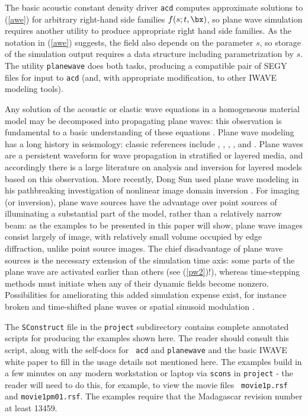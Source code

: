 The basic acoustic constant density driver {\tt acd} computes approximate solutions to (\ref{awe}) for arbitrary right-hand side families $f(s;t,\bx)$, so plane wave simulation requires another utility to produce appropriate right hand side families. As the notation in (\ref{awe}) suggests, the field also depends on the parameter $s$, so storage of the simulation output requires a data structure including parametrization by $s$. The utility {\tt planewave} does both tasks, producing a compatible pair of SEGY files for input to {\tt acd} (and, with appropriate modification, to other IWAVE modeling tools).

Any solution of the acoustic or elastic wave equations in a homogeneous material model may be decomposed into propagating plane waves: this observation is fundamental to a basic understanding of these equations \cite[]{CourHil:62,Ach:73}. Plane wave modeling has a long history in seismology: classic references include \cite{AkiRich:80}, \cite{DieSt:81}, \cite{sto81}, \cite{TreiGutWag:82}, and \cite{CarriKuoStof:84}. Plane waves are a persistent waveform for wave propagation in stratified or layered media, and accordingly there is a large literature on analysis and inversion for layered models based on this observation. More recently, Dong Sun used plane wave modeling in his pathbreaking investigation of nonlinear image domain inversion \cite[]{Sun:09a,SunSymes:SEG12}. For imaging (or inversion), plane wave sources have the advantage over point sources of illuminating a substantial part of the model, rather than a relatively narrow beam: as the examples to be presented in this paper will show, plane wave images consist largely of image, with relatively small volume occupied by edge diffraction, unlike point source images. The chief disadvantage of plane wave sources is the necessary extension of the simulation time axis: some parts of the plane wave are activated earlier than others (see (\ref{pw2})!), whereas time-stepping methods must initiate when any of their dynamic fields become nonzero. Possibilities for ameliorating this added simulation expense exist, for instance broken and time-shifted plane waves or spatial sinusoid modulation \cite[]{Soubaras:07}.

The {\tt SConstruct} file in the {\tt project} subdirectory contains
complete annotated scripts for producing the examples shown here. The
reader should consult this script, along with the self-docs for {\tt
acd} and {\tt planewave} and the basic IWAVE white
paper \cite[]{trip14:struct} to fill in the usage details not
mentioned here. The examples build in a few minutes on any modern
workstation or laptop via {\tt scons} in {\tt project} - the reader
will need to do this, for example, to view the movie files {\tt
movie1p.rsf} and {\tt movie1pm01.rsf}. The examples require that the
Madagascar revision number at least 13459.

